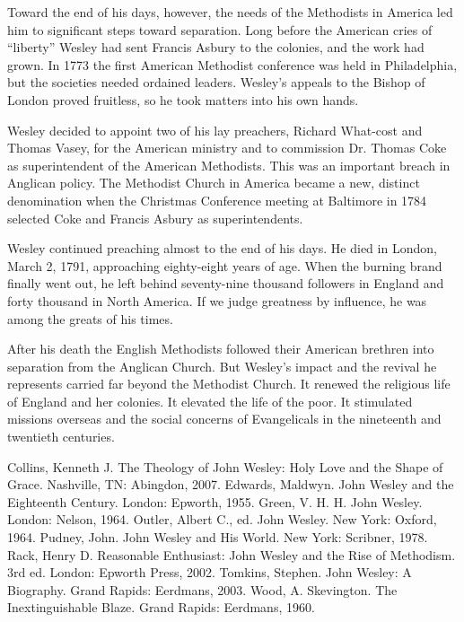 Toward the end of his days, however, the needs of the Methodists in America led him to significant
steps toward separation. Long before the American cries of “liberty” Wesley had sent Francis Asbury
to the colonies, and the work had grown. In 1773 the first American Methodist conference was held in
Philadelphia, but the societies needed ordained leaders. Wesley’s appeals to the Bishop of London
proved fruitless, so he took matters into his own hands.

Wesley decided to appoint two of his lay preachers, Richard What-cost and Thomas Vasey, for the
American ministry and to commission Dr. Thomas Coke as superintendent of the American Methodists.
This was an important breach in Anglican policy. The Methodist Church in America became a new,
distinct denomination when the Christmas Conference meeting at Baltimore in 1784 selected Coke and
Francis Asbury as superintendents.

Wesley continued preaching almost to the end of his days. He died in London, March 2, 1791,
approaching eighty-eight years of age. When the burning brand finally went out, he left behind
seventy-nine thousand followers in England and forty thousand in North America. If we judge
greatness by influence, he was among the greats of his times.

After his death the English Methodists followed their American brethren into separation from the
Anglican Church. But Wesley’s impact and the revival he represents carried far beyond the Methodist
Church. It renewed the religious life of England and her colonies. It elevated the life of the poor.
It stimulated missions overseas and the social concerns of Evangelicals in the nineteenth and
twentieth centuries.

\begin{readinglist}
\entry *Collins, Kenneth J. The Theology of John Wesley: Holy Love and the Shape of Grace.
  Nashville, TN: Abingdon, 2007.
\entry Edwards, Maldwyn. John Wesley and the Eighteenth Century. London: Epworth, 1955.
\entry Green, V. H. H. John Wesley. London: Nelson, 1964.
\entry Outler, Albert C., ed. John Wesley. New York: Oxford, 1964.
\entry Pudney, John. John Wesley and His World. New York: Scribner, 1978.
\entry *Rack, Henry D. Reasonable Enthusiast: John Wesley and the Rise of Methodism. 3rd ed. London:
  Epworth Press, 2002.
\entry Tomkins, Stephen. John Wesley: A Biography. Grand Rapids: Eerdmans, 2003.
\entry Wood, A. Skevington. The Inextinguishable Blaze. Grand Rapids: Eerdmans, 1960.
\end{readinglist}
